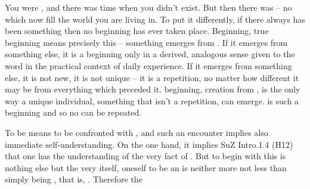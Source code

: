You were , and there was time when you didn't exist.  But then there
was  -- no  which now fill the world you are living
in.  To put it differently, if there always has been something then no beginning
has ever taken place.  Beginning, true beginning means precisely this --
something emerges from .  If it emerges from something else, it is a
beginning only in a derived, analogous sense given to the word in the practical
context of daily experience.  If it emerges from something else, it is not new,
it is not unique -- it is a repetition, no matter how different it may be from
everything which preceded it.   beginning, creation from
, is the only way a unique individual, something that isn't a
repetition, can emerge.   is such a beginning and so no 
can be repeated.

\pa To be  means to be confronted with , and
such an encounter implies also immediate self-understanding. On the one hand, it
implies \citet{being in such a way that one has an understanding of Being,}{SuZ}{
  Intro.1.4 (H12) } that one has the understanding of the very fact
of . But to begin with this  is nothing
else but the very  itself,  oneself to be an
 is neither more not less than simply being , that is,
.  Therefore the 

